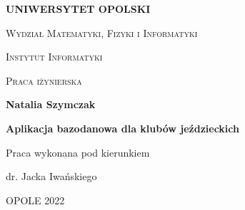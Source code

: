 \documentclass[12pt,twoside]{report}
\begin{document}
	\begin{titlepage}
		
		\begin{center}
			\begin{figure}[t]
				\centering
			\end{figure}
		\end{center}
		
		\begin{center}
			{\LARGE  \bf \textsc{UNIWERSYTET OPOLSKI}}
		\end{center}
		\vspace{0.2cm}
		\begin{center}
			{\large \textsc{Wydział Matematyki, Fizyki i Informatyki}}
		\end{center}
		\begin{center}
			{\Large \textsc{Instytut Informatyki}}
		\end{center}
		\vspace{0.5cm}
		\begin{center}
			\large    \textsc{Praca iżynierska}
		\end{center}
		\vspace{0.4cm}
		\begin{center}
			\large \textbf{Natalia Szymczak}
		\end{center}
		
		\vspace{0.4cm}
		\begin{center}
			\Large     \textbf{Aplikacja bazodanowa dla klubów jeździeckich}
		\end{center}
		\vspace{0.1cm}
		
		\begin{center}
			\large     \textsc{}
		\end{center}
		\vspace{1.3cm}
		
		\begin{flushright}
			{\large Praca wykonana pod kierunkiem\bigskip
				
				{\bf }} 
			dr. Jacka Iwańskiego
		\end{flushright}
		\vspace{0.7cm}
		\begin{center}
			{\large OPOLE 2022}
		\end{center}
	\end{titlepage}

	\thispagestyle{empty}
	\mbox{}
	
\end{document}

